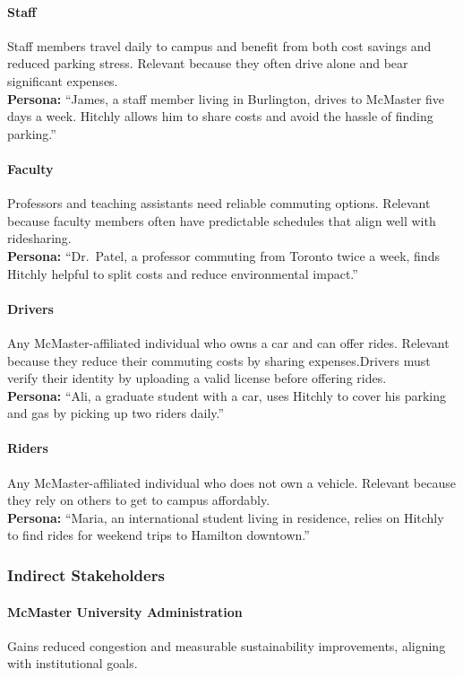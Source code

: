 \documentclass[12pt,letterpaper]{article}
\begin{document}
\paragraph{Staff}
Staff members travel daily to campus and benefit from both cost savings and reduced parking stress. 
Relevant because they often drive alone and bear significant expenses.\\
\textbf{Persona:} ``James, a staff member living in Burlington, drives to McMaster five days a week. Hitchly allows him to share costs and avoid the hassle of finding parking.''

\paragraph{Faculty}
Professors and teaching assistants need reliable commuting options. 
Relevant because faculty members often have predictable schedules that align well with ridesharing.\\
\textbf{Persona:} ``Dr.~Patel, a professor commuting from Toronto twice a week, finds Hitchly helpful to split costs and reduce environmental impact.''

\paragraph{Drivers}
Any McMaster-affiliated individual who owns a car and can offer rides. 
Relevant because they reduce their commuting costs by sharing expenses.Drivers must verify their identity by uploading a valid license before offering rides.\\
\textbf{Persona:} ``Ali, a graduate student with a car, uses Hitchly to cover his parking and gas by picking up two riders daily.''

\paragraph{Riders}
Any McMaster-affiliated individual who does not own a vehicle. 
Relevant because they rely on others to get to campus affordably.\\
\textbf{Persona:} ``Maria, an international student living in residence, relies on Hitchly to find rides for weekend trips to Hamilton downtown.''

\subsubsection*{Indirect Stakeholders}

\paragraph{McMaster University Administration}
Gains reduced congestion and measurable sustainability improvements, aligning with institutional goals.
\end{document}
